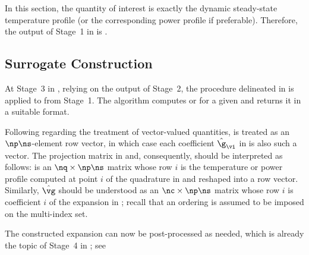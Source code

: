 In this section, the quantity of interest \g is exactly the dynamic steady-state
temperature profile \mq (or the corresponding power profile \mp if preferable).
Therefore, the output of Stage~1 in  is
.

\subsection{Surrogate Construction}

At Stage~3 in , relying on the output of Stage~2, the
procedure delineated in  is applied to
 from Stage~1. The algorithm computes
\mp or \mq for a given \vu and returns it in a suitable format.

Following  regarding the treatment of
vector-valued quantities, \g is treated as an $\np \ns$-element row vector, in
which case each coefficient $\hat{\g}_{\vi}$ in  is also
such a vector. The projection matrix in  and,
consequently,  should be interpreted as follows: \vg is an
$\nq \times \np \ns$ matrix whose row $i$ is the temperature or power profile
computed at point $i$ of the quadrature in  and reshaped
into a row vector. Similarly, $\hat{\vg}$ should be understood as an $\nc \times
\np \ns$ matrix whose row $i$ is coefficient $i$ of the expansion in
; recall that an ordering is assumed to be imposed on the
multi-index set.

The constructed expansion can now be post-processed as needed, which is already
the topic of Stage~4 in ; see 
